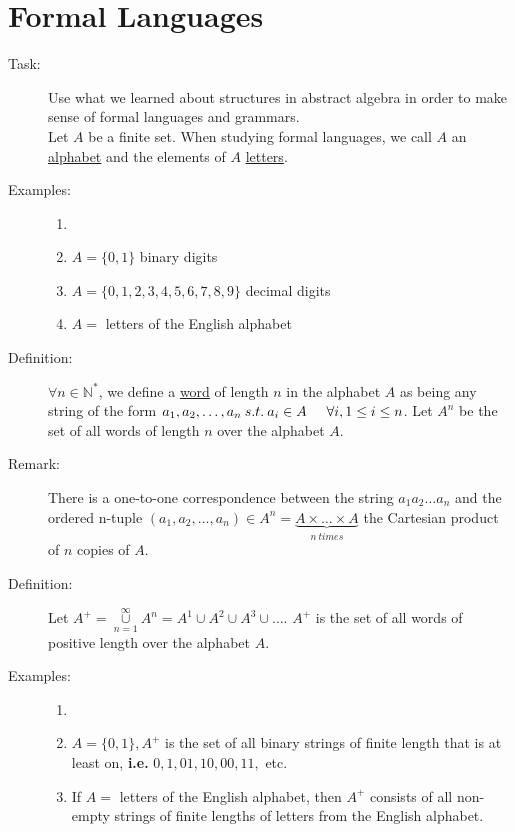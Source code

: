 \documentclass[10pt]{article}
\begin{document}
	\section{Formal Languages}
	\begin{description}
		\item[Task:] Use what we learned about structures in abstract algebra in order to make sense of formal languages and grammars. \\
		Let $A$ be a finite set. When studying formal languages, we call $A$ an \underline{alphabet} and the elements of $A$ \underline{letters}.
		\item[Examples:]
		\begin{enumerate}
			\item[]
			\item $A = \{0, 1\}$ \hspace{10mm} binary digits
			\item $A = \{0, 1, 2, 3, 4, 5, 6, 7, 8, 9\}$ \hspace{10mm} decimal digits
			\item $A =$ {letters of the English alphabet}
		\end{enumerate}
		\item[Definition:] $\forall n \in \mathbb{N}^*$, we define a \underline{word} of length $n$ in the alphabet $A$ as being any string of the form $a_1, a_2, \dots, a_n \: s.t. \: a_i \in A \hspace{5mm} \forall i, 1 \leq i \leq n$. Let $A^n$ be the set of all words of length $n$ over the alphabet $A$.
		\item[Remark:] There is a one-to-one correspondence between the string $a_1a_2\dots a_n$ and the ordered n-tuple $(a_1, a_2, \dots, a_n) \in A^n = \underset{n \: times}{\underbrace{A \times \dots \times A}}$ the Cartesian product of $n$ copies of $A$.
		\item[Definition:] Let $A^+ = \underset{n=1}{\overset{\infty}{\cup}} A^n = A^1 \cup A^2 \cup A^3 \cup \dots$. $A^+$ is the set of all words of positive length over the alphabet $A$.
		\item[Examples:]
		\begin{enumerate}
			\item[]
			\item $A = \{0, 1\}, A^+$ is the set of all binary strings of finite length that is at least on, \textbf{i.e.} $0, 1, 01, 10, 00, 11,$ etc.
			\item If $A =$ {letters of the English alphabet}, then $A^+$ consists of all non-empty strings of finite lengths of letters from the English alphabet. \\

\end{enumerate}
\end{description}
\end{document}
